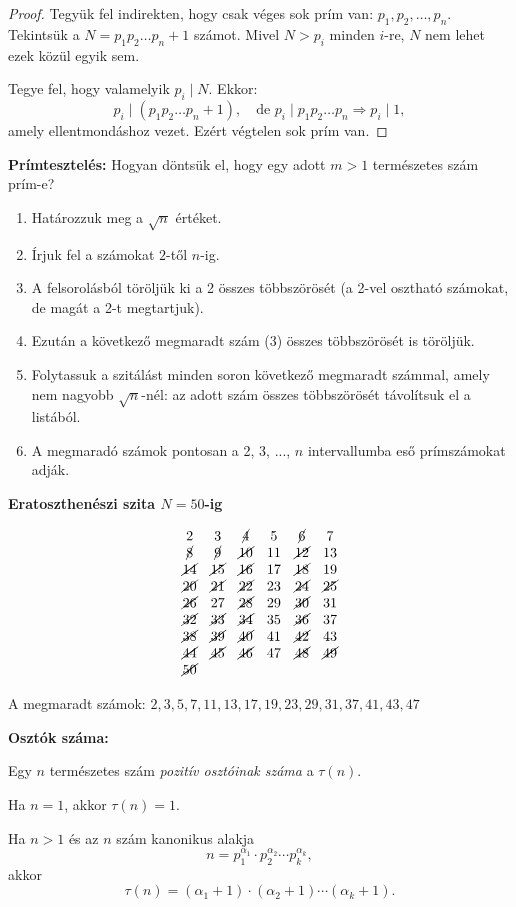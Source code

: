 \begin{proof}
Tegyük fel indirekten, hogy csak véges sok prím van: $p_{1},p_{2},\dots,p_{n}$.
Tekintsük a $N=p_{1}p_{2}\dots p_{n}+1$ számot. Mivel $N>p_{i}$
minden $i$-re, $N$ nem lehet ezek közül egyik sem.

Tegye fel, hogy valamelyik $p_{i}\mid N$. Ekkor: 
\[
p_{i}\mid(p_{1}p_{2}\dots p_{n}+1),\quad\text{de }p_{i}\mid p_{1}p_{2}\dots p_{n}\Rightarrow p_{i}\mid1,
\]
amely ellentmondáshoz vezet. Ezért végtelen sok prím van.
\end{proof}
\textbf{Prímtesztelés:} Hogyan döntsük el, hogy egy adott $m>1$ természetes
szám prím-e?
\begin{enumerate}
\item Határozzuk meg a $\sqrt{n}$ értéket. 
\item Írjuk fel a számokat $2$-től $n$-ig. 
\item A felsorolásból töröljük ki a 2 összes többszörösét (a 2-vel osztható
számokat, de magát a 2-t megtartjuk). 
\item Ezután a következő megmaradt szám (3) összes többszörösét is töröljük. 
\item Folytassuk a szitálást minden soron következő megmaradt számmal, amely
nem nagyobb $\sqrt{n}$-nél: az adott szám összes többszörösét távolítsuk
el a listából. 
\item A megmaradó számok pontosan a 2, 3, ..., $n$ intervallumba eső prímszámokat
adják. 
\end{enumerate}
\begin{example}
\textbf{Eratoszthenészi szita $N=50$-ig}

\[
\begin{array}{cccccc}
2 & 3 & \cancel{4} & 5 & \cancel{6} & 7\\
\cancel{8} & \cancel{9} & \cancel{10} & 11 & \cancel{12} & 13\\
\cancel{14} & \cancel{15} & \cancel{16} & 17 & \cancel{18} & 19\\
\cancel{20} & \cancel{21} & \cancel{22} & 23 & \cancel{24} & \cancel{25}\\
\cancel{26} & 27 & \cancel{28} & 29 & \cancel{30} & 31\\
\cancel{32} & \cancel{33} & \cancel{34} & 35 & \cancel{36} & 37\\
\cancel{38} & \cancel{39} & \cancel{40} & 41 & \cancel{42} & 43\\
\cancel{44} & \cancel{45} & \cancel{46} & 47 & \cancel{48} & \cancel{49}\\
\cancel{50}
\end{array}
\]

A megmaradt számok: $2,3,5,7,11,13,17,19,23,29,31,37,41,43,47$

\textbf{Osztók száma:}

Egy $n$ természetes szám \textit{pozitív osztóinak száma} a $\tau(n)$.

Ha $n=1$, akkor $\tau(n)=1$.

Ha $n>1$ és az $n$ szám kanonikus alakja 
\[
n=p_{1}^{\alpha_{1}}\cdot p_{2}^{\alpha_{2}}\cdots p_{k}^{\alpha_{k}},
\]
akkor 
\[
\tau(n)=(\alpha_{1}+1)\cdot(\alpha_{2}+1)\cdots(\alpha_{k}+1).
\]
\end{example}


